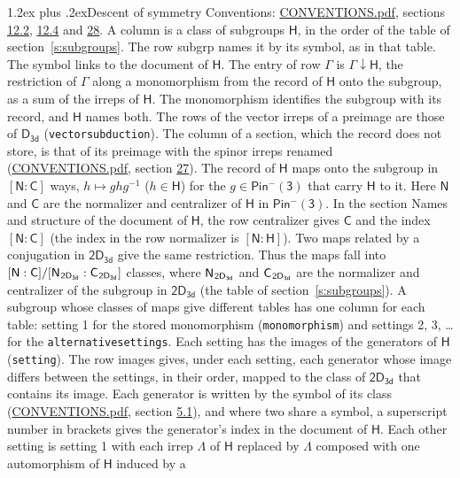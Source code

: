\documentclass[10pt,a4paper]{article}
\makeatletter
\renewcommand\section{\@startsection{section}{1}{\z@}{-3ex plus -1ex minus -.2ex}%
  {1.2ex plus .2ex}{\normalfont\large\sffamily\bfseries\color{parttitle}}}
\numberwithin{equation}{section}
\newcommand{\grp}[1]{\mathsf{#1}}
\newcommand{\grpindex}[2]{[#1 : #2]}
\newcommand{\restr}[2]{#1\!\downarrow#2}
\newcommand{\hairsp}{\mkern1mu}
\makeatother
\begin{document}
\section{Descent of symmetry}\label{s:subduction}
Conventions: \href{../../CONVENTIONS.pdf}{CONVENTIONS.pdf}, sections \href{../../../rotation/CONVENTIONS.pdf\#conv.12.2}{12.2}, \href{../../../rotation/CONVENTIONS.pdf\#conv.12.4}{12.4} and \href{../../CONVENTIONS.pdf\#conv.28}{28}.
A column is a class of subgroups $\grp{H}$, in the order of the table of section~\ref{s:subgroups}. The row subgrp names it by its symbol, as in that table. The symbol links to the document of $\grp{H}$. The entry of row $\Gamma$ is $\restr{\Gamma}{\grp{H}}$, the restriction of $\Gamma$ along a monomorphism from the record of $\grp{H}$ onto the subgroup, as a sum of the irreps of $\grp{H}$. The monomorphism identifies the subgroup with its record, and $\grp{H}$ names both. The rows of the vector irreps of a preimage are those of \href{../../../rotation/data/pdf/D3d.pdf}{$\grp{D_{3d}}$} (\texttt{vectorsubduction}). The column of a section, which the record does not store, is that of its preimage with the spinor irreps renamed (\href{../../CONVENTIONS.pdf}{CONVENTIONS.pdf}, section \href{../../CONVENTIONS.pdf\#conv.27}{27}). \label{n:group.normalizer.o3}\label{n:group.centralizer.o3}\label{n:element.h}The record of $\grp{H}$ maps onto the subgroup in $\grpindex{\grp{N}}{\grp{C}}$ ways, $h \mapsto g h g^{-1}$ ($h \in \grp{H}$) for the $g \in \grp{Pin^{-}(3)}$ that carry $\grp{H}$ to it. Here $\grp{N}$ and $\grp{C}$ are the normalizer and centralizer of $\grp{H}$ in \href{Pinminus3.pdf}{$\grp{Pin^{-}(3)}$}. In the section Names and structure of the document of $\grp{H}$, the row centralizer gives $\grp{C}$ and the index $\grpindex{\grp{N}}{\grp{C}}$ (the index in the row normalizer is $\grpindex{\grp{N}}{\grp{H}}$). Two maps related by a conjugation in $\grp{2D_{3d}}$ give the same restriction. Thus the maps fall into $\grpindex{\grp{N}}{\grp{C}}/\grpindex{\grp{N}_{\hairsp \grp{2D_{3d}}}}{\grp{C}_{\hairsp \grp{2D_{3d}}}}$ classes, where $\grp{N}_{\hairsp \grp{2D_{3d}}}$ and $\grp{C}_{\hairsp \grp{2D_{3d}}}$ are the normalizer and centralizer of the subgroup in $\grp{2D_{3d}}$ (the table of section~\ref{s:subgroups}). \label{n:head.setting}A subgroup whose classes of maps give different tables has one column for each table: setting 1 for the stored monomorphism (\texttt{monomorphism}) and settings 2, 3, \dots{} for the \texttt{alternativesettings}. Each setting has the images of the generators of $\grp{H}$ (\texttt{setting}). \label{n:head.images}The row images gives, under each setting, each generator whose image differs between the settings, in their order, mapped to the class of $\grp{2D_{3d}}$ that contains its image. Each generator is written by the symbol of its class (\href{../../CONVENTIONS.pdf}{CONVENTIONS.pdf}, section \href{../../../rotation/CONVENTIONS.pdf\#conv.5.1}{5.1}), and where two share a symbol, a superscript number in brackets gives the generator's index in the document of $\grp{H}$. \label{n:irrep.Delta}Each other setting is setting 1 with each irrep $\Lambda$ of $\grp{H}$ replaced by $\Lambda$ composed with one automorphism of $\grp{H}$ induced by a 
\end{document}
